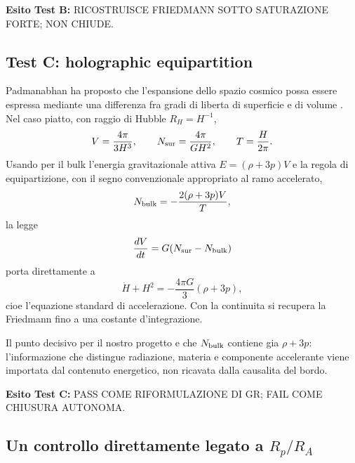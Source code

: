 \documentclass[11pt,a4paper]{article}
\newcommand{\status}[1]{\textsf{#1}}
\begin{document}
\textbf{Esito Test B:} \status{RICOSTRUISCE FRIEDMANN SOTTO SATURAZIONE FORTE; NON CHIUDE}.

\subsection{Test C: holographic equipartition}

Padmanabhan ha proposto che l'espansione dello spazio cosmico possa essere espressa mediante una differenza fra gradi di liberta di superficie e di volume \cite{Padmanabhan2012}. Nel caso piatto, con raggio di Hubble $R_H=H^{-1}$,
\begin{equation}
 V=\frac{4\pi}{3H^3},\qquad N_{\rm sur}=\frac{4\pi}{G H^2},\qquad T=\frac{H}{2\pi}.
\end{equation}
Usando per il bulk l'energia gravitazionale attiva $E=(\rho+3p)V$ e la regola di equipartizione, con il segno convenzionale appropriato al ramo accelerato,
\begin{equation}
 N_{\rm bulk}=-\frac{2(\rho+3p)V}{T},
\end{equation}
la legge
\begin{equation}
 \frac{dV}{dt}=G(N_{\rm sur}-N_{\rm bulk})
\end{equation}
porta direttamente a
\begin{equation}
 \boxed{\dot H+H^2=-\frac{4\pi G}{3}(\rho+3p),}
\end{equation}
cioe l'equazione standard di accelerazione. Con la continuita si recupera la Friedmann fino a una costante d'integrazione.

Il punto decisivo per il nostro progetto e che $N_{\rm bulk}$ contiene gia $\rho+3p$: l'informazione che distingue radiazione, materia e componente accelerante viene importata dal contenuto energetico, non ricavata dalla causalita del bordo.

\textbf{Esito Test C:} \status{PASS COME RIFORMULAZIONE DI GR; FAIL COME CHIUSURA AUTONOMA}.

\subsection{Un controllo direttamente legato a $R_p/R_A$}
\end{document}
